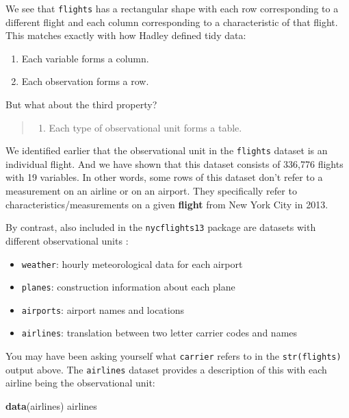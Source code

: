 \documentclass[]{tufte-book}
\newenvironment{Shaded}{\begin{snugshade}}{\end{snugshade}}
\newcommand{\KeywordTok}[1]{\textcolor[rgb]{0.13,0.29,0.53}{\textbf{{#1}}}}
\newcommand{\NormalTok}[1]{{#1}}
\providecommand{\tightlist}{%
  \setlength{\itemsep}{0pt}\setlength{\parskip}{0pt}}
\begin{document}
We see that \texttt{flights} has a rectangular shape with each row
corresponding to a different flight and each column corresponding to a
characteristic of that flight. This matches exactly with how Hadley
defined tidy data:

\begin{enumerate}
\def\labelenumi{\arabic{enumi}.}
\tightlist
\item
  Each variable forms a column.
\item
  Each observation forms a row.
\end{enumerate}

But what about the third property?

\begin{quote}
\begin{enumerate}
\def\labelenumi{\arabic{enumi}.}
\setcounter{enumi}{2}
\tightlist
\item
  Each type of observational unit forms a table.
\end{enumerate}
\end{quote}

We identified earlier that the observational unit in the
\texttt{flights} dataset is an individual flight. And we have shown that
this dataset consists of 336,776 flights with 19 variables. In other
words, some rows of this dataset don't refer to a measurement on an
airline or on an airport. They specifically refer to
characteristics/measurements on a given \textbf{flight} from New York
City in 2013.

By contrast, also included in the \texttt{nycflights13} package are
datasets with different observational units \citep{R-nycflights13}:

\begin{itemize}
\tightlist
\item
  \texttt{weather}: hourly meteorological data for each airport
\item
  \texttt{planes}: construction information about each plane
\item
  \texttt{airports}: airport names and locations
\item
  \texttt{airlines}: translation between two letter carrier codes and
  names
\end{itemize}

You may have been asking yourself what \texttt{carrier} refers to in the
\texttt{str(flights)} output above. The \texttt{airlines} dataset
provides a description of this with each airline being the observational
unit:

\begin{Shaded}
\begin{Highlighting}[]
\KeywordTok{data}\NormalTok{(airlines)}
\NormalTok{airlines}
\end{Highlighting}
\end{Shaded}
\end{document}
